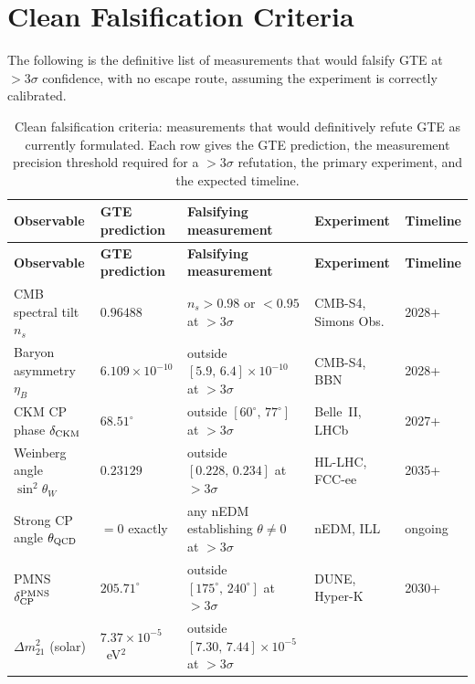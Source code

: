 \documentclass[11pt,a4paper]{article}
\newcommand{\sigW}{\sin^2\!\theta_W}
\begin{document}
\section{Clean Falsification Criteria}
\label{sec:falsification}

The following is the definitive list of measurements that would falsify GTE at
$>3\sigma$ confidence, with no escape route, assuming the experiment is
correctly calibrated.

\begin{longtable}[l]{@{}p{3.5cm}p{3.2cm}p{2.4cm}p{2.4cm}p{2.5cm}@{}}
\caption{Clean falsification criteria: measurements that would definitively
refute GTE as currently formulated.  Each row gives the GTE prediction, the
measurement precision threshold required for a $>3\sigma$ refutation, the primary
experiment, and the expected timeline.}
\label{tab:falsify}\\
\hline
\textbf{Observable} & \textbf{GTE prediction} &
\textbf{Falsifying measurement} & \textbf{Experiment} & \textbf{Timeline} \\
\hline
\endfirsthead
\hline
\textbf{Observable} & \textbf{GTE prediction} &
\textbf{Falsifying measurement} & \textbf{Experiment} & \textbf{Timeline} \\
\hline
\endhead
\hline
\endfoot
CMB spectral tilt $n_s$ &
  $0.96488$ &
  $n_s > 0.98$ or $<0.95$ at $>3\sigma$ &
  CMB-S4, Simons Obs. &
  2028+ \\[4pt]
Baryon asymmetry $\eta_B$ &
  $6.109 \times 10^{-10}$ &
  outside $[5.9,\,6.4]\times10^{-10}$ at $>3\sigma$ &
  CMB-S4, BBN &
  2028+ \\[4pt]
CKM CP phase $\delta_{\rm CKM}$ &
  $68.51^\circ$ &
  outside $[60^\circ,\,77^\circ]$ at $>3\sigma$ &
  Belle~II, LHCb &
  2027+ \\[4pt]
Weinberg angle $\sigW$ &
  $0.23129$ &
  outside $[0.228,\,0.234]$ at $>3\sigma$ &
  HL-LHC, FCC-ee &
  2035+ \\[4pt]
Strong CP angle $\theta_{\rm QCD}$ &
  $= 0$ exactly &
  any nEDM establishing $\theta \neq 0$ at $>3\sigma$ &
  nEDM, ILL &
  ongoing \\[4pt]
PMNS $\delta_{\rm CP}^{\rm PMNS}$ &
  $205.71^\circ$ &
  outside $[175^\circ,\,240^\circ]$ at $>3\sigma$ &
  DUNE, Hyper-K &
  2030+ \\[4pt]
$\Delta m^2_{21}$ (solar) &
  $7.37\times10^{-5}$~eV$^2$ &
  outside $[7.30,\,7.44]\times10^{-5}$ at $>3\sigma$ &

\end{longtable}
\end{document}
